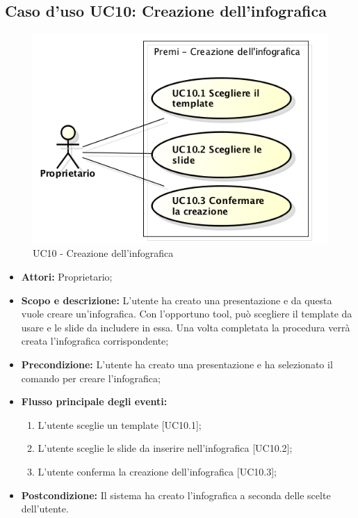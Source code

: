 \subsection{Caso d'uso UC10: Creazione dell'infografica}
\begin{figure}[h] 
	\centering 
	\includegraphics[scale=0.45] {img/UC10.png}
	\caption{UC10 - Creazione dell'\gls{infografica}}
\end{figure}

\begin{itemize}
	\item \textbf{Attori:} Proprietario;
	\item \textbf{Scopo e descrizione:} L'utente ha creato una presentazione e da questa vuole creare un'\gls{infografica}. Con l'opportuno tool, può scegliere il \gls{template} da usare e le \gls{slide} da includere in essa. Una volta completata la procedura verrà creata l'\gls{infografica} corrispondente;
	\item \textbf{Precondizione:} L'utente ha creato una presentazione e ha selezionato il comando per creare l'\gls{infografica};
	
	\item \textbf{Flusso principale degli eventi:}
	\begin{enumerate}
		\item L'utente sceglie un \gls{template} [UC10.1];
		\item L'utente sceglie le \gls{slide} da inserire nell'\gls{infografica} [UC10.2];
		\item L'utente conferma la creazione dell'\gls{infografica} [UC10.3];
	\end{enumerate}
	\item \textbf{Postcondizione:} Il sistema ha creato l'\gls{infografica} a seconda delle scelte dell'utente.
\end{itemize}


